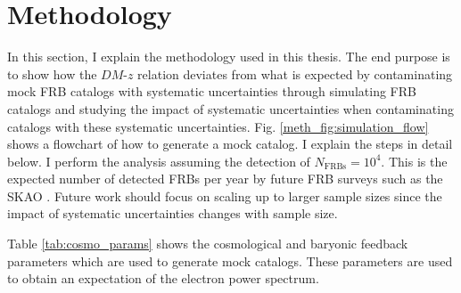 \chapter{Methodology} \label{chap:method}
In this section, I explain the methodology used in this thesis. The end purpose is to show how the $DM$-$z$ relation deviates from what is expected by contaminating mock FRB catalogs with systematic uncertainties through simulating FRB catalogs and studying the impact of systematic uncertainties when contaminating catalogs with these systematic uncertainties. Fig. \ref{meth_fig:simulation_flow} shows a flowchart of how to generate a mock catalog. I explain the steps in detail below. I perform the analysis assuming the detection of $N_\mathrm{FRBs} = 10^4$. This is the expected number of detected FRBs per year by future FRB surveys such as the SKAO \citep{ macquart2015fast}. Future work should focus on scaling up to larger sample sizes since the impact of systematic uncertainties changes with sample size.

Table \ref{tab:cosmo_params} shows the cosmological and baryonic feedback parameters which are used to generate mock catalogs. These parameters are used to obtain an expectation of the electron power spectrum.

